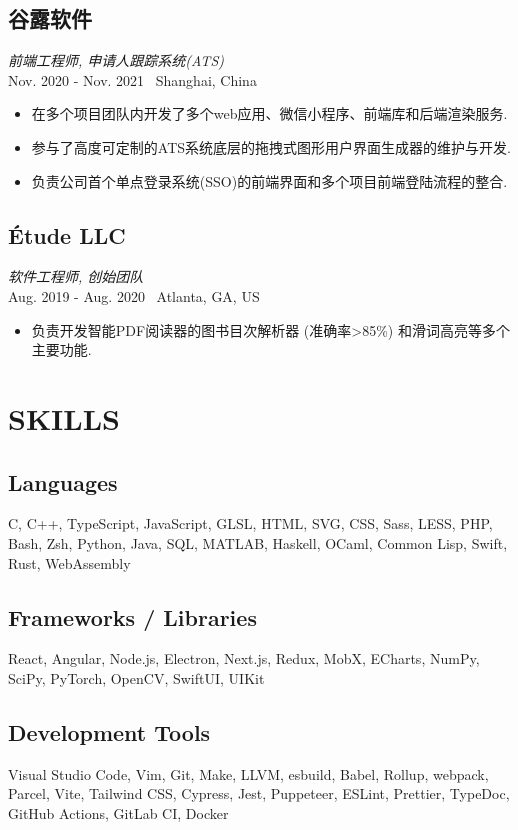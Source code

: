 \documentclass[11pt,twocolumn]{article}
\begin{document}
\subsection*{谷露软件}
\textit{前端工程师, 申请人跟踪系统(ATS)}\\
Nov. 2020 - Nov. 2021 \textbullet\ Shanghai, China
\begin{itemize}
\item 在多个项目团队内开发了多个web应用、微信小程序、前端库和后端渲染服务.
\item 参与了高度可定制的ATS系统底层的拖拽式图形用户界面生成器的维护与开发.
\item 负责公司首个单点登录系统(SSO)的前端界面和多个项目前端登陆流程的整合.
\end{itemize}

\subsection*{Étude LLC}
\textit{软件工程师, 创始团队}\\
Aug. 2019 - Aug. 2020 \textbullet\ Atlanta, GA, US
\begin{itemize}
\item 负责开发智能PDF阅读器的图书目次解析器 (准确率>85\%) 和滑词高亮等多个主要功能.
\end{itemize}

\section*{\textnormal{SKILLS}}

\subsection*{Languages}
C, C++, TypeScript, JavaScript, GLSL, HTML, SVG, CSS, Sass, LESS, PHP, Bash, Zsh, Python, Java, SQL, MATLAB, Haskell, OCaml, Common Lisp, Swift, Rust, WebAssembly

\subsection*{Frameworks / Libraries}
React, Angular, Node.js, Electron, Next.js, Redux, MobX, ECharts, NumPy, SciPy, PyTorch, OpenCV, SwiftUI, UIKit

\subsection*{Development Tools}
Visual Studio Code, Vim, Git, Make, LLVM, esbuild, Babel, Rollup, webpack, Parcel, Vite, Tailwind CSS, Cypress, Jest, Puppeteer, ESLint, Prettier, TypeDoc, GitHub Actions, GitLab CI, Docker
\end{document}
